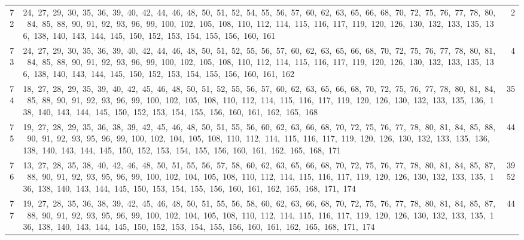 \begin{longtable}{c|p{}|r}
72 & 24,\ 27,\ 29,\ 30,\ 35,\ 36,\ 39,\ 40,\ 42,\ 44,\ 46,\ 48,\ 50,\ 51,\ 52,\ 54,\ 55,\ 56,\ 57,\ 60,\ 62,\ 63,\ 65,\ 66,\ 68,\ 70,\ 72,\ 75,\ 76,\ 77,\ 78,\ 80,\ 84,\ 85,\ 88,\ 90,\ 91,\ 92,\ 93,\ 96,\ 99,\ 100,\ 102,\ 105,\ 108,\ 110,\ 112,\ 114,\ 115,\ 116,\ 117,\ 119,\ 120,\ 126,\ 130,\ 132,\ 133,\ 135,\ 136,\ 138,\ 140,\ 143,\ 144,\ 145,\ 150,\ 152,\ 153,\ 154,\ 155,\ 156,\ 160,\ 161 & 2 \\
73 & 24,\ 27,\ 29,\ 30,\ 35,\ 36,\ 39,\ 40,\ 42,\ 44,\ 46,\ 48,\ 50,\ 51,\ 52,\ 55,\ 56,\ 57,\ 60,\ 62,\ 63,\ 65,\ 66,\ 68,\ 70,\ 72,\ 75,\ 76,\ 77,\ 78,\ 80,\ 81,\ 84,\ 85,\ 88,\ 90,\ 91,\ 92,\ 93,\ 96,\ 99,\ 100,\ 102,\ 105,\ 108,\ 110,\ 112,\ 114,\ 115,\ 116,\ 117,\ 119,\ 120,\ 126,\ 130,\ 132,\ 133,\ 135,\ 136,\ 138,\ 140,\ 143,\ 144,\ 145,\ 150,\ 152,\ 153,\ 154,\ 155,\ 156,\ 160,\ 161,\ 162 & 4 \\
74 & 18,\ 27,\ 28,\ 29,\ 35,\ 39,\ 40,\ 42,\ 45,\ 46,\ 48,\ 50,\ 51,\ 52,\ 55,\ 56,\ 57,\ 60,\ 62,\ 63,\ 65,\ 66,\ 68,\ 70,\ 72,\ 75,\ 76,\ 77,\ 78,\ 80,\ 81,\ 84,\ 85,\ 88,\ 90,\ 91,\ 92,\ 93,\ 96,\ 99,\ 100,\ 102,\ 105,\ 108,\ 110,\ 112,\ 114,\ 115,\ 116,\ 117,\ 119,\ 120,\ 126,\ 130,\ 132,\ 133,\ 135,\ 136,\ 138,\ 140,\ 143,\ 144,\ 145,\ 150,\ 152,\ 153,\ 154,\ 155,\ 156,\ 160,\ 161,\ 162,\ 165,\ 168 & 35 \\
75 & 19,\ 27,\ 28,\ 29,\ 35,\ 36,\ 38,\ 39,\ 42,\ 45,\ 46,\ 48,\ 50,\ 51,\ 55,\ 56,\ 60,\ 62,\ 63,\ 66,\ 68,\ 70,\ 72,\ 75,\ 76,\ 77,\ 78,\ 80,\ 81,\ 84,\ 85,\ 88,\ 90,\ 91,\ 92,\ 93,\ 95,\ 96,\ 99,\ 100,\ 102,\ 104,\ 105,\ 108,\ 110,\ 112,\ 114,\ 115,\ 116,\ 117,\ 119,\ 120,\ 126,\ 130,\ 132,\ 133,\ 135,\ 136,\ 138,\ 140,\ 143,\ 144,\ 145,\ 150,\ 152,\ 153,\ 154,\ 155,\ 156,\ 160,\ 161,\ 162,\ 165,\ 168,\ 171 & 44 \\
76 & 13,\ 27,\ 28,\ 35,\ 38,\ 40,\ 42,\ 46,\ 48,\ 50,\ 51,\ 55,\ 56,\ 57,\ 58,\ 60,\ 62,\ 63,\ 65,\ 66,\ 68,\ 70,\ 72,\ 75,\ 76,\ 77,\ 78,\ 80,\ 81,\ 84,\ 85,\ 87,\ 88,\ 90,\ 91,\ 92,\ 93,\ 95,\ 96,\ 99,\ 100,\ 102,\ 104,\ 105,\ 108,\ 110,\ 112,\ 114,\ 115,\ 116,\ 117,\ 119,\ 120,\ 126,\ 130,\ 132,\ 133,\ 135,\ 136,\ 138,\ 140,\ 143,\ 144,\ 145,\ 150,\ 153,\ 154,\ 155,\ 156,\ 160,\ 161,\ 162,\ 165,\ 168,\ 171,\ 174 & 3952 \\
77 & 19,\ 27,\ 28,\ 35,\ 36,\ 38,\ 39,\ 42,\ 45,\ 46,\ 48,\ 50,\ 51,\ 55,\ 56,\ 58,\ 60,\ 62,\ 63,\ 66,\ 68,\ 70,\ 72,\ 75,\ 76,\ 77,\ 78,\ 80,\ 81,\ 84,\ 85,\ 87,\ 88,\ 90,\ 91,\ 92,\ 93,\ 95,\ 96,\ 99,\ 100,\ 102,\ 104,\ 105,\ 108,\ 110,\ 112,\ 114,\ 115,\ 116,\ 117,\ 119,\ 120,\ 126,\ 130,\ 132,\ 133,\ 135,\ 136,\ 138,\ 140,\ 143,\ 144,\ 145,\ 150,\ 152,\ 153,\ 154,\ 155,\ 156,\ 160,\ 161,\ 162,\ 165,\ 168,\ 171,\ 174 & 44 \\

\end{longtable}
